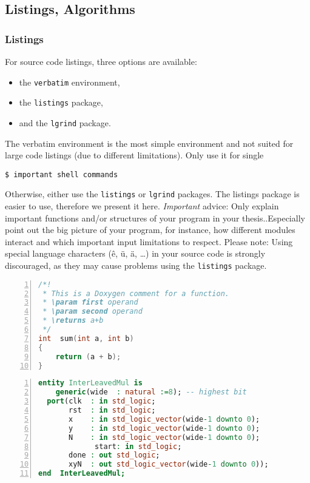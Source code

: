\subsection{Listings, Algorithms}

\subsubsection{Listings}
For source code listings, three options are available:
\begin{itemize}
\item the \texttt{verbatim} environment,
\item the \texttt{listings} package,
\item and the \texttt{lgrind} package.
\end{itemize}

The verbatim environment is the most simple environment and not suited for large code listings (due to different limitations). Only use it for single

\begin{verbatim}
$ important shell commands
\end{verbatim}

Otherwise, either use the \texttt{listings} or \texttt{lgrind} packages. The listings package is easier to use, therefore we present it here. \emph{Important} advice: Only explain important functions and/or structures of your program in your thesis..Especially point out the big picture of your program, for instance, how different modules interact and which important input limitations to respect. Please note: Using special language characters (\^{e},\/ \"{u},\/ \"{a}, \dots) in your source code is strongly discouraged, as they may cause problems using the \texttt{listings} package.

\begin{lstlisting}[language={C}, caption={A sample listing of a C function. Description of the function is here. Please note that different languages are available.}, numbers=left]
/*!
 * This is a Doxygen comment for a function.
 * \param first operand
 * \param second operand
 * \returns a+b
 */
int  sum(int a, int b)
{
	return (a + b);
}
\end{lstlisting}

\begin{lstlisting}[language={VHDL}, caption={A sample listing of a VHDL entity. Description of the entity is here. Please note that different languages are available.}, numbers=left]
entity InterLeavedMul is
	generic(wide  : natural :=8); -- highest bit
  port(clk  : in std_logic;
       rst  : in std_logic;
       x    : in std_logic_vector(wide-1 downto 0);
       y    : in std_logic_vector(wide-1 downto 0);
       N    : in std_logic_vector(wide-1 downto 0);
			 start: in std_logic;
       done : out std_logic;
       xyN  : out std_logic_vector(wide-1 downto 0));
end  InterLeavedMul;
\end{lstlisting}

